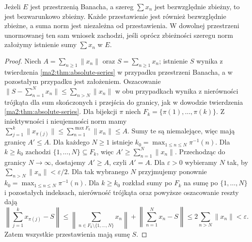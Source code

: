 \begin{twierdzenie}
\label{ma2:thm:absolute-rearrangement}
Jeżeli $E$ jest przestrzenią Banacha, a szereg
$\sum x_n$ jest bezwzględnie zbieżny, to jest bezwarunkowo
zbieżny. Każde przestawienie jest również bezwzględnie
zbieżne, a suma norm jest niezależna od przestawienia.
W dowolnej przestrzeni unormowanej ten sam wniosek
zachodzi, jeśli oprócz zbieżności szeregu norm założymy
istnienie sumy $\sum x_n$ w $E$.
\end{twierdzenie}
\begin{proof}
Niech $A=\sum_{n\ge1}\|x_n\|$ oraz $S=\sum_{n\ge1}x_n$;
istnienie $S$ wynika z twierdzenia \ref{ma2:thm:absolute-series}
w przypadku przestrzeni Banacha, a w pozostałym przypadku
jest założeniem. Oszacowanie
$\|S-\sum_{n=1}^N x_n\|\le\sum_{n>N}\|x_n\|$
w obu przypadkach wynika z nierówności trójkąta dla
sum skończonych i przejścia do granicy, jak w dowodzie
twierdzenia \ref{ma2:thm:absolute-series}.
Dla bijekcji $\pi$ niech $F_k=\{\pi(1),\ldots,\pi(k)\}$.
Z iniektywności i nieujemności norm mamy
$\sum_{j=1}^k\|x_{\pi(j)}\|\le
\sum_{n=1}^{\max F_k}\|x_n\|\le A$.
Sumy te są niemalejące, więc mają granicę $A'\le A$.
Dla każdego $N\ge1$ istnieje
$k_0=\max_{1\le n\le N}\pi^{-1}(n)$.
Dla $k\ge k_0$ zachodzi $\{1,\ldots,N\}\subseteq F_k$,
więc $A'\ge\sum_{n=1}^N\|x_n\|$.
Przechodząc do granicy $N\to\infty$, dostajemy $A'\ge A$,
czyli $A'=A$.
Dla $\varepsilon>0$ wybieramy $N$ tak, by
$\sum_{n>N}\|x_n\|<\varepsilon/2$.
Dla tak wybranego $N$ przyjmujemy ponownie
$k_0=\max_{1\le n\le N}\pi^{-1}(n)$.
Dla $k\ge k_0$ rozkład sumy po $F_k$ na sumę po
$\{1,\ldots,N\}$ i pozostałych indeksach, nierówność
trójkąta oraz powyższe oszacowanie reszty dają
\[
 \left\|\sum_{j=1}^k x_{\pi(j)}-S\right\|
 \le\left\|\sum_{n\in F_k\setminus\{1,\ldots,N\}}x_n\right\|
 +\left\|\sum_{n=1}^N x_n-S\right\|
 \le 2\sum_{n>N}\|x_n\|<\varepsilon.
\]
Zatem wszystkie przestawienia mają sumę $S$.
\end{proof}

